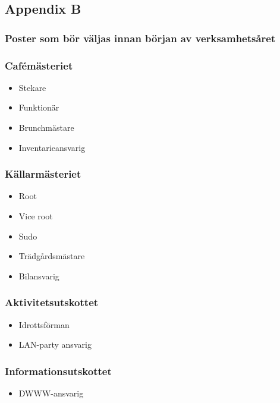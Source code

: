 \documentclass{dsekprotokoll}
\begin{document}
\pagebreak
\subsection*{Appendix B}
\subsubsection*{Poster som bör väljas innan början av verksamhetsåret}
\begin{multicols}{2}

    \subsubsection*{Cafémästeriet}
    \begin{itemize}
        \item Stekare
        \item Funktionär
        \item Brunchmästare
        \item Inventarieansvarig
    \end{itemize}

    \subsubsection*{Källarmästeriet}
    \begin{itemize}
        \item Root
        \item Vice root
        \item Sudo
        \item Trädgårdsmästare
        \item Bilansvarig
    \end{itemize}

    \subsubsection*{Aktivitetsutskottet}
    \begin{itemize}
        \item Idrottsförman
        \item LAN-party ansvarig
    \end{itemize}

    \subsubsection*{Informationsutskottet}
    \begin{itemize}
        \item DWWW-ansvarig
    \end{itemize}


\end{multicols}
\end{document}
